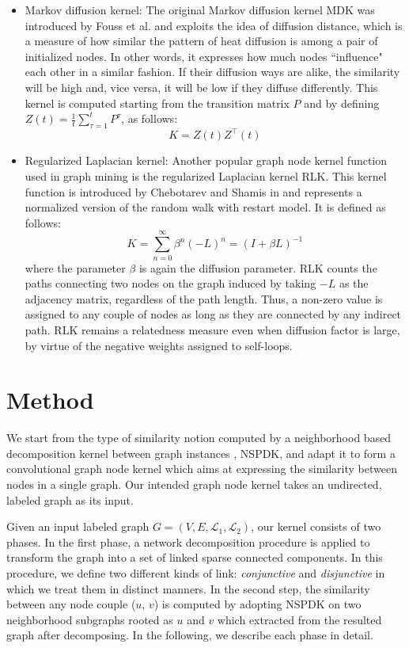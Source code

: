 \documentclass[review]{elsarticle}
\begin{document}
\begin{itemize}
\item Markov diffusion kernel: The original Markov diffusion kernel MDK was introduced by Fouss et al. \cite{fouss2006experimental} and exploits the idea of diffusion distance, which is a measure of how similar the pattern of heat diffusion is among a pair of initialized nodes. In other words, it expresses how much nodes ``influence" each other in a similar fashion. If their diffusion ways are alike, the similarity will be high and, vice versa, it will be low if they diffuse differently. This kernel is computed starting from the transition matrix $P$ and by defining $Z(t) = \frac{1}{t}\sum_{\tau=1}^{t}P^{\tau}$, as follows:
\begin{equation} 
\label{MDK-formula}
K = Z(t)Z^{\top}(t)
\end{equation}

\item Regularized Laplacian kernel: Another popular graph node kernel function used in graph mining is the regularized Laplacian kernel RLK. This kernel function is introduced by Chebotarev and Shamis in \cite{chebotarev2006matrix} and represents a normalized version of the random walk with restart model. It is defined as follows:
\begin{equation} 
\label{RLK-formula}
K = \sum_{n=0}^{\infty}\beta^{n}(-L)^n = (I + \beta L)^{-1}
\end{equation}
where the parameter $\beta$ is again the diffusion parameter. RLK counts the paths connecting two nodes on the graph induced by taking $-L$ as the adjacency matrix, regardless of the path length. Thus, a non-zero value is assigned to any couple of nodes as long as they are connected by any indirect path. RLK remains a relatedness measure even when diffusion factor is large, by virtue of the negative weights assigned to self-loops.

\end{itemize}
\section{Method}
\label{method}
We start from the type of similarity notion computed by a neighborhood based decomposition kernel between graph instances \cite{costa2010fast}, NSPDK, and adapt it to form a convolutional graph node kernel which aims at expressing the similarity between nodes in a single graph. Our intended graph node kernel takes an undirected, labeled graph as its input.

Given an input labeled graph $G=(V,E, \mathcal{L}_1, \mathcal{L}_2)$, our kernel consists of two phases. In the first phase, a network decomposition procedure is applied to transform the graph into a set of linked sparse connected components. In this procedure, we define two different kinds of link: \textit{conjunctive} and \textit{disjunctive} in which we treat them in distinct manners. In the second step, the similarity between any node couple ($u$, $v$) is computed by adopting NSPDK on two neighborhood subgraphs rooted as $u$ and $v$ which extracted from the resulted graph after decomposing. In the following, we describe each phase in detail.
\end{document}
